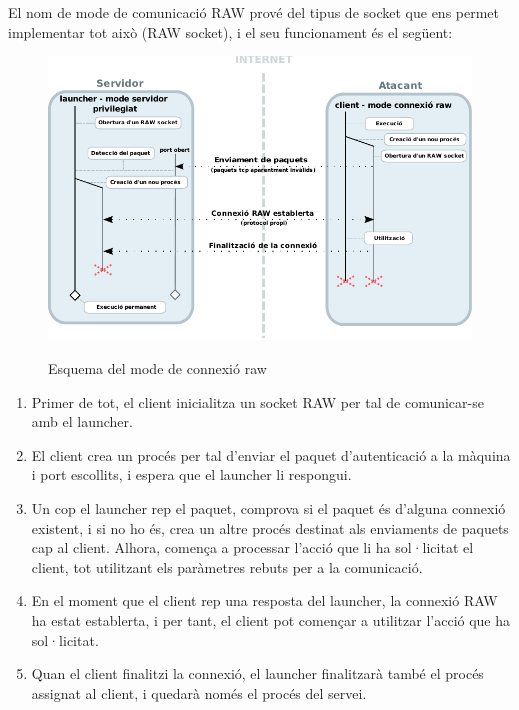 El nom de mode de comunicació RAW prové del tipus de socket que ens permet implementar tot això (RAW socket),
i el seu funcionament és el següent: \\

\begin{figure}[htp]
    \centering
    \includegraphics[scale=1.2,keepaspectratio]{diagrames/solutionDesignPrivilegedServerModeRAW.pdf} \\
    \caption{Esquema del mode de connexió raw}
    \label{fig:modePrivilegedServerRAW}
\end{figure}

\begin{enumerate}
    \item Primer de tot, el client inicialitza un socket RAW per tal de comunicar-se amb el launcher.
    \item El client crea un procés per tal d'enviar el paquet d'autenticació a la màquina i port escollits,
        i espera que el launcher li respongui.
    \item Un cop el launcher rep el paquet, comprova si el paquet és d'alguna connexió existent, i si no
        ho és, crea un altre procés destinat als enviaments de paquets cap al client. Alhora, comença a
        processar l'acció que li ha sol·licitat el client, tot utilitzant els paràmetres rebuts per a la 
        comunicació.
    \item En el moment que el client rep una resposta del launcher, la connexió RAW ha estat establerta, i 
        per tant, el client pot començar a utilitzar l'acció que ha sol·licitat.
    \item Quan el client finalitzi la connexió, el launcher finalitzarà també el procés assignat al client,
        i quedarà només el procés del servei.
\end{enumerate}

